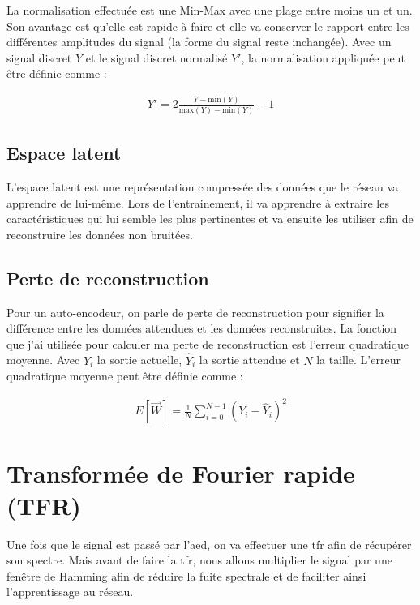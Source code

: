 La normalisation effectuée est une Min-Max avec une plage entre moins un et un. Son avantage est qu'elle est rapide à faire et elle va conserver le rapport entre les différentes amplitudes du signal (la forme du signal reste inchangée). Avec un signal discret $Y$ et le signal discret normalisé $Y'$, la normalisation appliquée peut être définie comme :

{\Large
	\setlength{\abovedisplayskip}{-0.5cm}
	\begin{align*}
		Y' = 2\frac{Y-\text{min}(Y)}{\text{max}(Y)-\text{min}(Y)}-1
	\end{align*}
}

\subsection{Espace latent}

L'espace latent est une représentation compressée des données que le réseau va apprendre de lui-même. Lors de l'entrainement, il va apprendre à extraire les caractéristiques qui lui semble les plus pertinentes et va ensuite les utiliser afin de reconstruire les données non bruitées.

\subsection{Perte de reconstruction}

Pour un auto-encodeur, on parle de perte de reconstruction pour signifier la différence entre les données attendues et les données reconstruites. La fonction que j'ai utilisée pour calculer ma perte de reconstruction est l'erreur quadratique moyenne. Avec $Y_{i}$ la sortie actuelle, $\hat{Y}_{i}$ la sortie attendue et $N$ la taille. L'erreur quadratique moyenne peut être définie comme :

{\Large
	\setlength{\abovedisplayskip}{-0.5cm}
	\begin{align*}
		E[\overrightarrow{W}] = \frac{1}{N}\sum_{i=0}^{N-1}{(Y_{i} - \hat{Y}_{i})^2}
	\end{align*}
}

\section{Transformée de Fourier rapide (TFR)}
\label{sec:5.3}

Une fois que le signal est passé par l'\gls{aed}, on va effectuer une \gls{tfr} afin de récupérer son spectre. Mais avant de faire la \gls{tfr}, nous allons multiplier le signal par une fenêtre de Hamming afin de réduire la fuite spectrale et de faciliter ainsi l'apprentissage au réseau.

